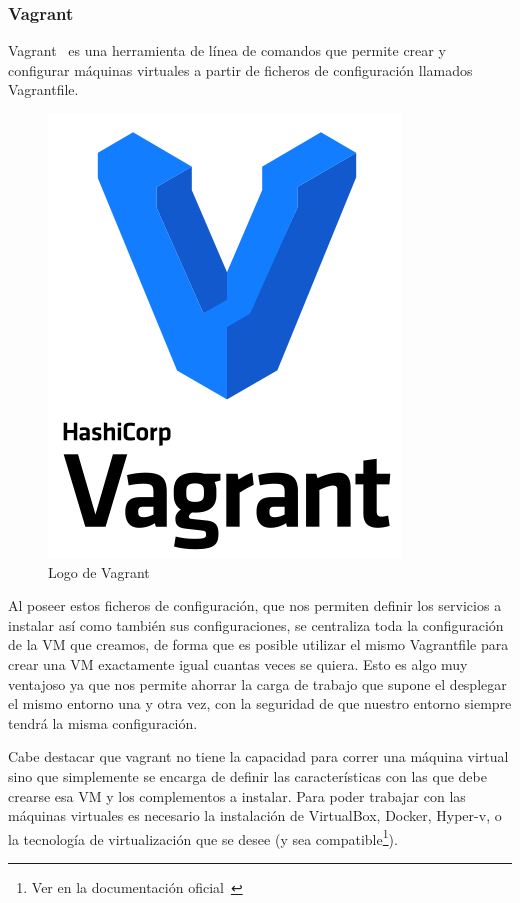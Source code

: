 \subsubsection{Vagrant}
	Vagrant~\cite{vagrant} es una herramienta de línea de comandos que permite crear y configurar máquinas virtuales a partir de ficheros de configuración llamados Vagrantfile.

	\begin{figure}[h]
	\centering
	\includegraphics[width=0.2 \textwidth]{../imgs/EdA/vagrant.png}
	\caption{Logo de Vagrant}
	\label{fig:vagrant}
	\end{figure}

	Al poseer estos ficheros de configuración, que nos permiten definir los servicios a instalar así como también sus configuraciones, se centraliza toda la configuración de la VM que creamos, de forma que es  posible  utilizar el mismo Vagrantfile para crear una VM exactamente igual cuantas veces se quiera. Esto es algo muy ventajoso ya que nos permite ahorrar la carga de trabajo que supone el desplegar el mismo entorno una y otra vez, con la seguridad de que nuestro entorno siempre tendrá la misma configuración.

	Cabe destacar que vagrant no tiene la capacidad para correr una máquina virtual sino que simplemente se encarga de definir las características con las que debe crearse esa VM y los complementos a instalar. Para poder trabajar con las máquinas virtuales es necesario la instalación de VirtualBox, Docker, Hyper-v, o la tecnología de virtualización que se desee (y sea compatible\footnote{Ver en la documentación oficial~\cite{vagrant}}).


